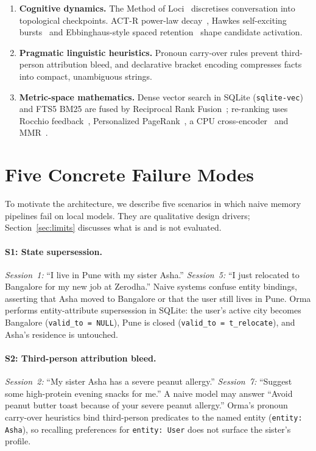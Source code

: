 \documentclass[11pt]{article}
\newcommand{\orma}{\mbox{Orma}}
\begin{document}
\begin{enumerate}
    \item \textbf{Cognitive dynamics.} The Method of Loci~\cite{yates1966art} discretises conversation into topological checkpoints. ACT-R power-law decay~\cite{anderson1998actr}, Hawkes self-exciting bursts~\cite{hawkes1971spectra} and Ebbinghaus-style spaced retention~\cite{ebbinghaus1885memory} shape candidate activation.
    \item \textbf{Pragmatic linguistic heuristics.} Pronoun carry-over rules prevent third-person attribution bleed, and declarative bracket encoding compresses facts into compact, unambiguous strings.
    \item \textbf{Metric-space mathematics.} Dense vector search in SQLite (\texttt{sqlite-vec}) and FTS5 BM25 are fused by Reciprocal Rank Fusion~\cite{cormack2009rrf}; re-ranking uses Rocchio feedback~\cite{rocchio1971relevance}, Personalized PageRank~\cite{page1999pagerank}, a CPU cross-encoder~\cite{jiao2020tinybert} and MMR~\cite{carbonell1998mmr}.
\end{enumerate}

\section{Five Concrete Failure Modes}
\label{sec:failures}

To motivate the architecture, we describe five scenarios in which naive memory pipelines fail on local models. They are qualitative design drivers; Section~\ref{sec:limits} discusses what is and is not evaluated.

\paragraph{S1: State supersession.}
\emph{Session~1:} ``I live in Pune with my sister Asha.'' \emph{Session~5:} ``I just relocated to Bangalore for my new job at Zerodha.''
Naive systems confuse entity bindings, asserting that Asha moved to Bangalore or that the user still lives in Pune.
\orma{} performs entity-attribute supersession in SQLite: the user's active city becomes Bangalore (\texttt{valid\_to = NULL}), Pune is closed (\texttt{valid\_to = t\_relocate}), and Asha's residence is untouched.

\paragraph{S2: Third-person attribution bleed.}
\emph{Session~2:} ``My sister Asha has a severe peanut allergy.'' \emph{Session~7:} ``Suggest some high-protein evening snacks for me.''
A naive model may answer ``Avoid peanut butter toast because of your severe peanut allergy.''
\orma's pronoun carry-over heuristics bind third-person predicates to the named entity (\texttt{entity: Asha}), so recalling preferences for \texttt{entity: User} does not surface the sister's profile.
\end{document}

